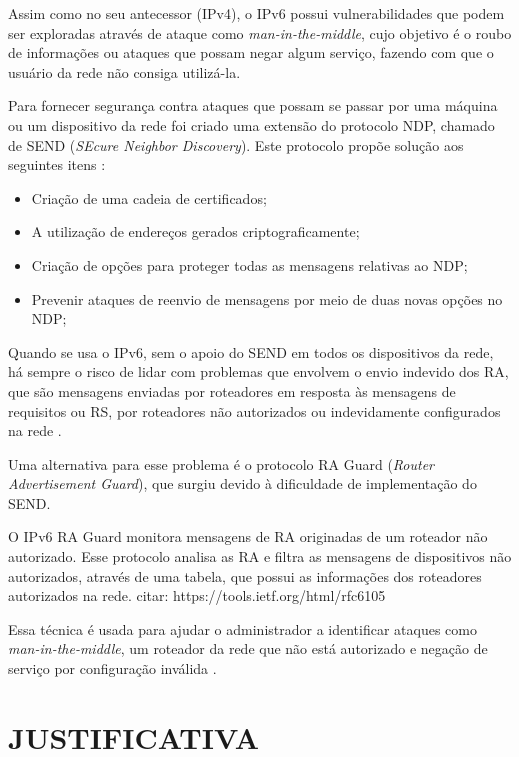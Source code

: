 Assim como no seu antecessor (IPv4), o IPv6 possui vulnerabilidades que podem ser exploradas através de ataque como \textit{man-in-the-middle}, cujo objetivo é o roubo de informações ou ataques que possam negar algum serviço, fazendo com que o usuário da rede não consiga utilizá-la.

Para fornecer segurança contra ataques que possam se passar por uma máquina ou um dispositivo da rede foi criado uma extensão do protocolo NDP, chamado de SEND (\textit{SEcure Neighbor Discovery}). Este protocolo propõe solução aos seguintes itens \cite{rfcSEND}: 

\begin{itemize}
\item Criação de uma cadeia de certificados;
\item A utilização de endereços gerados criptograficamente;
\item Criação de opções para proteger todas as mensagens relativas ao NDP;
\item Prevenir ataques de reenvio de mensagens por meio de duas novas opções no NDP;
\end{itemize}

Quando se usa o IPv6, sem o apoio do SEND em todos os dispositivos da rede, há sempre o risco de lidar com problemas que envolvem o envio indevido dos RA, que são mensagens enviadas por roteadores em resposta às mensagens de requisitos ou RS, por roteadores não autorizados ou indevidamente configurados na rede \cite{teleco}.

Uma alternativa para esse problema é o protocolo RA Guard (\textit{Router Advertisement Guard}), que surgiu devido à dificuldade de implementação do SEND.

O IPv6 RA Guard monitora mensagens de RA originadas de um roteador não autorizado. Esse protocolo analisa as RA e filtra as mensagens de dispositivos não autorizados, através de uma tabela, que possui as informações dos roteadores autorizados na rede. citar: https://tools.ietf.org/html/rfc6105

Essa técnica é usada para ajudar o administrador a identificar ataques como \textit{man-in-the-middle}, um roteador da rede que não está autorizado e negação de serviço por configuração inválida \cite{ra-icmpv6}.


\section{JUSTIFICATIVA}\label{sec:justificativa}


